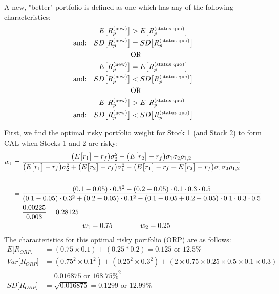 \documentclass[12pt]{article}
\begin{document}
A new, "better" portfolio is defined as one which has any of the following characteristics:
\begin{align*}
	E\big[R_p^{\text{(new)}}\big] &> E\big[R_p^{\text{(status quo)}}\big]\\
	\text{and:\quad}SD\big[R_p^{\text{(new)}}\big] &= SD\big[R_p^{\text{(status quo)}}\big]\\
	&\text{OR}\\
	E\big[R_p^{\text{(new)}}\big] &= E\big[R_p^{\text{(status quo)}}\big]\\
	\text{and:\quad}SD\big[R_p^{\text{(new)}}\big] &< SD\big[R_p^{\text{(status quo)}}\big]\\
	&\text{OR}\\
	E\big[R_p^{\text{(new)}}\big] &> E\big[R_p^{\text{(status quo)}}\big]\\
	\text{and:\quad}SD\big[R_p^{\text{(new)}}\big] &< SD\big[R_p^{\text{(status quo)}}\big]\\
\end{align*}

First, we find the optimal risky portfolio weight for Stock 1 (and Stock 2) to form CAL when Stocks 1 and 2 are risky:
\begin{align*}
	w_1 &= \frac{\big(E\big[r_1\big]-r_f\big)\sigma_2^2-\big(E\big[r_2\big]-r_f\big)\sigma_1\sigma_2\rho_{1,2}}{\big(E\big[r_1\big]-r_f\big)\sigma_2^2 + \big(E\big[r_2\big]-r_f\big)\sigma_1^2-\big(E\big[r_1\big]-r_f+E\big[r_2\big]-r_f\big)\sigma_1\sigma_2\rho_{1,2}}\\
	&\\
	&= \frac{(0.1-0.05)\cdot0.3^2-(0.2-0.05)\cdot0.1\cdot0.3\cdot0.5}{(0.1-0.05)\cdot0.3^2+(0.2-0.05)\cdot0.1^2-(0.1-0.05+0.2-0.05)\cdot0.1\cdot0.3\cdot0.5}\\
	&= \frac{0.00225}{0.003} = 0.28125\\
	&\text{\qquad\qquad\qquad\qquad\qquad} w_1 = 0.75 \text{\qquad\qquad} w_2 = 0.25\\
\end{align*}
The characteristics for this optimal risky portfolio (ORP) are as follows:
\begin{align*}
	E\big[R_{ORP}\big] &= (0.75\times0.1) + (0.25*0.2) = 0.125 \text{ or } 12.5\%\\
	Var\big[R_{ORP}\big] &= (0.75^2\times0.1^2)+(0.25^2\times0.3^2) + (2\times0.75\times0.25\times0.5\times0.1\times0.3)\\
	&= 0.016875 \text{ or } 168.75\%^2\\
	SD\big[R_{ORP}\big] &= \sqrt{0.016875} = 0.1299 \text { or } 12.99\%
\end{align*}
\end{document}
